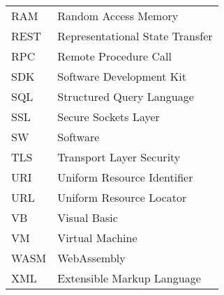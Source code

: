 \begin{tabular}{ll}
RAM & Random Access Memory \\
REST & Representational State Transfer \\
RPC & Remote Procedure Call \\
SDK & Software Development Kit \\
SQL & Structured Query Language \\
SSL & Secure Sockets Layer \\
SW & Software \\
TLS & Transport Layer Security \\
URI & Uniform Resource Identifier \\
URL & Uniform Resource Locator \\
VB & Visual Basic \\
VM & Virtual Machine \\
WASM & WebAssembly \\
XML & Extensible Markup Language \\
\end{tabular}

